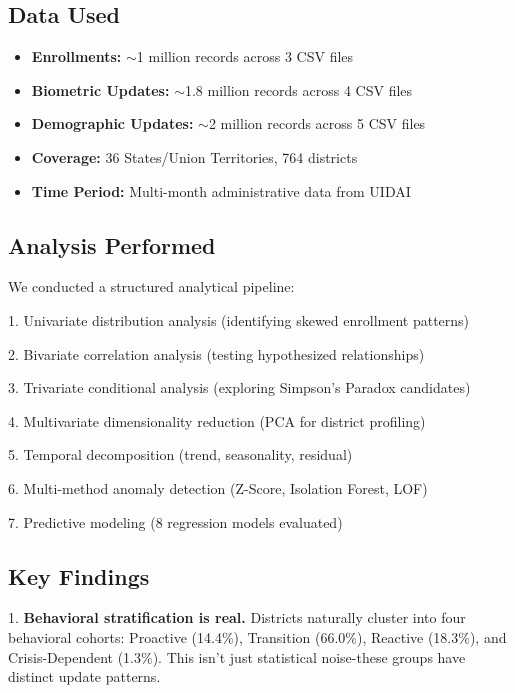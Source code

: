 \documentclass[11pt, a4paper]{article}
\begin{document}
\subsection{Data Used}

\begin{itemize}
\item \textbf{Enrollments:} $\sim$1 million records across 3 CSV files

\item \textbf{Biometric Updates:} $\sim$1.8 million records across 4 CSV files

\item \textbf{Demographic Updates:} $\sim$2 million records across 5 CSV files

\item \textbf{Coverage:} 36 States/\allowbreak Union Territories, 764 districts

\item \textbf{Time Period:} Multi-month administrative data from UIDAI
\end{itemize}

\subsection{Analysis Performed}

We conducted a structured analytical pipeline:


1. Univariate distribution analysis (identifying skewed enrollment patterns)

2. Bivariate correlation analysis (testing hypothesized relationships)

3. Trivariate conditional analysis (exploring Simpson's Paradox candidates)

4. Multivariate dimensionality reduction (PCA for district profiling)

5. Temporal decomposition (trend, seasonality, residual)

6. Multi-method anomaly detection (Z-Score, Isolation Forest, LOF)

7. Predictive modeling (8 regression models evaluated)


\subsection{Key Findings}

1. \textbf{Behavioral stratification is real.} Districts naturally cluster into four behavioral cohorts: Proactive (14.4\%), Transition (66.0\%), Reactive (18.3\%), and Crisis-Dependent (1.3\%). This isn't just statistical noise-these groups have distinct update patterns.
\end{document}
